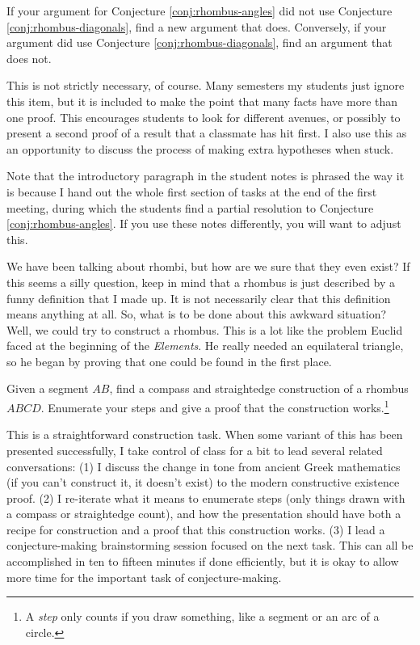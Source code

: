 \begin{challenge}\label{conj:rhombus-angles-redo}
If your argument for Conjecture \ref{conj:rhombus-angles} did not use Conjecture \ref{conj:rhombus-diagonals}, find a new argument that does.
Conversely, if your argument did use Conjecture \ref{conj:rhombus-diagonals}, find an argument that does not.
\end{challenge}

\begin{annotation}
{
\color{blue}
This is not strictly necessary, of course. 
Many semesters my students just ignore this item, but
it is included to make the point that many facts have more than one proof.
This encourages students to look for different avenues, or possibly to present a second proof of a result that a classmate has hit first.
I also use this as an opportunity to discuss the process of making extra hypotheses when stuck.

Note that the introductory paragraph in the student notes is phrased the way it is because I hand out the whole first section of tasks at the end of the first meeting, during which the students find a partial resolution to Conjecture \ref{conj:rhombus-angles}. If you use these notes differently, you will want to adjust this.
}
\end{annotation}


We have been talking about rhombi, but how are we sure that they even exist?
If this seems a silly question, keep in mind that a rhombus is just described by a funny definition that I made up.
It is not necessarily clear that this definition means anything at all.
So, what is to be done about this awkward situation?
Well, we could try to construct a rhombus.
This is a lot like the problem Euclid faced at the beginning of the \emph{Elements}.
He really needed an equilateral triangle, so he began by proving that one could be found in the first place.

\begin{challenge}\label{prob:rhombus-construct}
Given a segment $AB$, find a compass and straightedge construction of a rhombus $ABCD$.
Enumerate your steps and give a proof that the construction works.\footnote{A \emph{step} only counts if you draw something, like a segment or an arc of a circle.}
\end{challenge}

\begin{annotation}
{
\color{blue}
This is a straightforward construction task. When some variant of this has been presented successfully, I take control of class for a bit to lead several related conversations: 
(1) I discuss the change in tone from ancient Greek mathematics (if you can't construct it, it doesn't exist) to the modern constructive existence proof.
(2) I re-iterate what it means to enumerate steps (only things drawn with a compass or straightedge count), and how the presentation should have both a recipe for construction and a proof that this construction works.
(3) I lead a conjecture-making brainstorming session focused on the next task. 
This can all be accomplished in ten to fifteen minutes if done efficiently, but it is okay to allow more time for the important task of conjecture-making.
}
\end{annotation}

